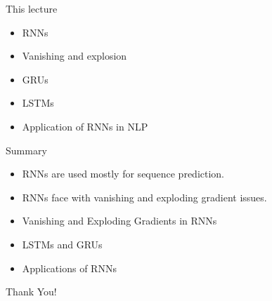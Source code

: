 \begin{frame}
\titlepage
\end{frame}

\begin{frame}{This lecture}
\vspace*{1cm}
\begin{itemize}
        \item RNNs
        \item Vanishing and explosion
        \item GRUs
        \item LSTMs
        \item Application of RNNs in NLP
\end{itemize}
\end{frame}







\begin{frame}{Summary}
    \begin{itemize}
        \item RNNs are used mostly for sequence prediction.
        \item RNNs face with vanishing and exploding gradient issues. 
        \item Vanishing and Exploding Gradients in RNNs
        \item LSTMs and GRUs
        \item Applications of RNNs
    \end{itemize}
\end{frame}
\begin{frame}[c]
\begin{center}
\LARGE{Thank You!}
\end{center}
\end{frame}

